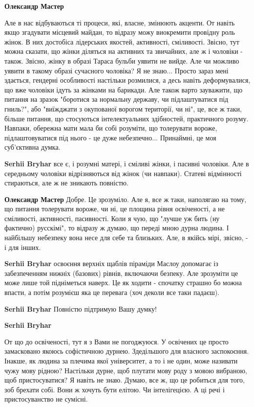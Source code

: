 \begin{itemize}
\begin{itemize} %
\textbf{Олександр Мастер} 

Але в нас відбуваються ті процеси, які, власне, змінюють акценти. От навіть
якщо згадувати місцевий майдан, то відразу можу виокремити провідну роль жінок.
В них достобіса лідерських якостей, активності, сміливості. Звісно, тут можна
сказати, що жінки діляться на активних та звичайних, але ж і чоловіки - також.
Звісно, жінку в образі Тараса бульби уявити не вийде. Але чи можливо уявити в
такому образі сучасного чоловіка? Я не знаю... Просто зараз мені здається,
гендерні особливості настільки розмилися, а десь навіть деформувалися, що вже
чоловіки ідуть за жінками на барикади. Але також варто зауважити, що питання на
зразок "боротися за нормальну державу, чи підлаштуватися під гниль?", або
"виїжджати з окупованої ворогом території, чи ні", це, все ж таки, більше
питання, що стосуються інтелектуальних здібностей, практичного розуму. Навпаки,
обережна мати мала би собі розуміти, що толерувати вороже, підлаштовуватися під
нього - це дуже небезпечно... Принаймні, це моя суб'єктивна думка.

\textbf{Serhii Bryhar} все є, і розумні матері, і сміливі жінки, і пасивні чоловіки. Але в середньому чоловіки відрізняються від жінок (чи навпаки). Статеві відмінності стираються, але ж не зникають повністю.

\textbf{Олександр Мастер} Добре. Це зрозуміло. Але я, все ж таки, наполягаю на тому, що питання толерувати вороже, чи ні, це площина рівня освіченості, а не сміливості, активності, пасивності. Коли я чую, що "лучше уж бить (ну фактично) русскімі", то відразу ж думаю, що переді мною дурна людина. І найбільшу небезпеку вона несе для себе та близьких. Але, в якійсь мірі, звісно, - і для інших.

\textbf{Serhii Bryhar} освоєння верхніх щаблів піраміди Маслоу допомагає із забезпеченням нижніх (базових) рівнів, включаючи безпеку. Але зрозуміти це може лише той підніметься наверх. Це як ходити - спочатку страшно бо можна впасти, а потім розумієш яка це перевага (хоч деколи все таки падаєш).

\textbf{Serhii Bryhar} Повністю підтримую Вашу думку!

\textbf{Serhii Bryhar} 

От що до освіченості, тут я з Вами не погоджуюся. У освічених це просто
замасковано якоюсь софістичною дурнею. Здедільшого для власного заспокоєння.
Інакше, як людина за плечима якої університет, а то і не один, може називати
чужу мову рідною? Настільки дурне, щоб плутати мову роду з мовою вибраною, щоб
пристосуватися? Я навіть не знаю. Думаю, все ж, що це робиться для того, зоб
брехати собі. Вони ж хочуть бути елітою. Чи інтелігецією. А ці речі і
пристосуванство не сумісні.


\end{itemize}
\end{itemize}
